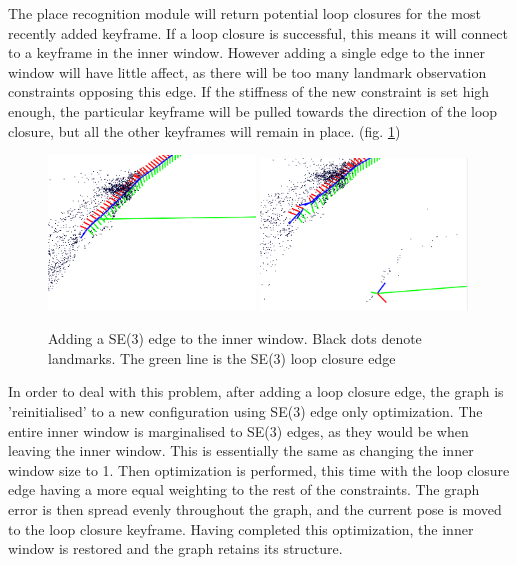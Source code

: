 The place recognition module will return potential loop closures for the most recently added keyframe.  If a loop closure is successful, this means it will connect to a keyframe in the inner window.  However adding a single edge to the inner window will have little affect, as there will be too many landmark observation constraints opposing this edge.  If the stiffness of the new constraint is set high enough, the particular keyframe will be pulled towards the direction of the loop closure, but all the other keyframes will remain in place. (fig. \ref{fig:graph_fail})

\begin{figure}[H]
  \centering
    \includegraphics[width=0.49\textwidth]{chapters/images/before_opt}
    \includegraphics[width=0.49\textwidth]{chapters/images/after_opt}
  \caption{Adding a SE(3) edge to the inner window.  Black dots denote landmarks.  The green line is the SE(3) loop closure edge}
  \label{fig:graph_fail}
\end{figure}

In order to deal with this problem, after adding a loop closure edge, the graph is 'reinitialised' to a new configuration using SE(3) edge only optimization.  The entire inner window is marginalised to SE(3) edges, as they would be when leaving the inner window.  This is essentially the same as changing the inner window size to 1.  Then optimization is performed, this time with the loop closure edge having a more equal weighting to the rest of the constraints.  The graph error is then spread evenly throughout the graph, and the current pose is moved to the loop closure keyframe.  Having completed this optimization, the inner window is restored and the graph retains its structure.

